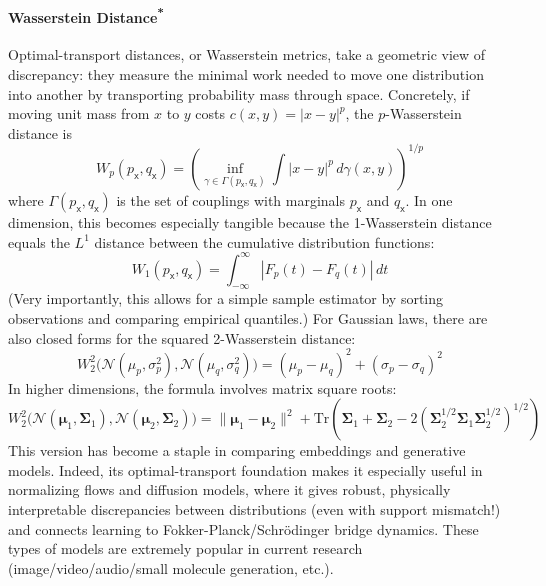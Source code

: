 \paragraph*{\texorpdfstring{Wasserstein Distance\textsuperscript{*}}{Wasserstein Distance}} Optimal-transport distances, or Wasserstein metrics, take a geometric view of discrepancy: they measure the minimal work needed to move one distribution into another by transporting probability mass through space. Concretely, if moving unit mass from $x$ to $y$ costs $c(x,y)=|x-y|^p$, the $p$-Wasserstein distance is
\begin{equation}
    W_p(p_{\mathsf{x}},q_{\mathsf{x}})=\left(\inf_{\gamma\in\Gamma(p_{\mathsf{x}},q_{\mathsf{x}})}\int |x-y|^p\,d\gamma(x,y)\right)^{1/p}
\end{equation}
where $\Gamma(p_{\mathsf{x}},q_{\mathsf{x}})$ is the set of couplings with marginals $p_{\mathsf{x}}$ and $q_{\mathsf{x}}$. In one dimension, this becomes especially tangible because the 1-Wasserstein distance equals the $L^1$ distance between the cumulative distribution functions:
\begin{equation}
    W_1(p_{\mathsf{x}},q_{\mathsf{x}})=\int_{-\infty}^{\infty}|F_p(t)-F_q(t)|\,dt
\end{equation}
(Very importantly, this allows for a simple sample estimator by sorting observations and comparing empirical quantiles.) For Gaussian laws, there are also closed forms for the squared 2-Wasserstein distance:
\begin{equation}
    W_2^2\big(\mathcal{N}(\mu_p,\sigma_p^2),\mathcal{N}(\mu_q,\sigma_q^2)\big)=(\mu_p-\mu_q)^2+(\sigma_p-\sigma_q)^2
\end{equation}
In higher dimensions, the formula involves matrix square roots:
\begin{equation}
    W_2^2\big(\mathcal{N}(\boldsymbol{\mu}_1,\boldsymbol{\Sigma}_1),\mathcal{N}(\boldsymbol{\mu}_2,\boldsymbol{\Sigma}_2)\big)=\|\boldsymbol{\mu}_1-\boldsymbol{\mu}_2\|^2+\mathrm{Tr}\!\left(\boldsymbol{\Sigma}_1+\boldsymbol{\Sigma}_2-2\!\left(\boldsymbol{\Sigma}_2^{1/2}\boldsymbol{\Sigma}_1\boldsymbol{\Sigma}_2^{1/2}\right)^{1/2}\right)
\end{equation}
This version has become a staple in comparing embeddings and generative models. Indeed, its optimal-transport foundation makes it especially useful in normalizing flows and diffusion models, where it gives robust, physically interpretable discrepancies between distributions (even with support mismatch!) and connects learning to Fokker-Planck/Schr\"odinger bridge dynamics. These types of models are extremely popular in current research (image/video/audio/small molecule generation, etc.).

